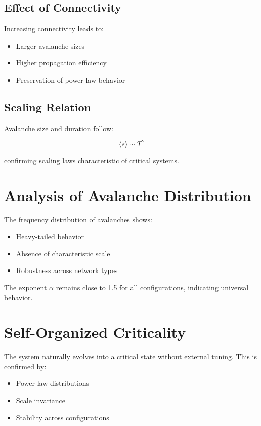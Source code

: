 \documentclass[12pt]{article}
\begin{document}
\subsection{Effect of Connectivity}
Increasing connectivity leads to:

\begin{itemize}
\item Larger avalanche sizes
\item Higher propagation efficiency
\item Preservation of power-law behavior
\end{itemize}

\subsection{Scaling Relation}
Avalanche size and duration follow:

\begin{equation}
\langle s \rangle \sim T^\gamma
\end{equation}

confirming scaling laws characteristic of critical systems.

\section{Analysis of Avalanche Distribution}

The frequency distribution of avalanches shows:

\begin{itemize}
\item Heavy-tailed behavior
\item Absence of characteristic scale
\item Robustness across network types
\end{itemize}

The exponent $\alpha$ remains close to 1.5 for all configurations, indicating universal behavior.

\section{Self-Organized Criticality}

The system naturally evolves into a critical state without external tuning. This is confirmed by:

\begin{itemize}
\item Power-law distributions
\item Scale invariance
\item Stability across configurations
\end{itemize}
\end{document}
